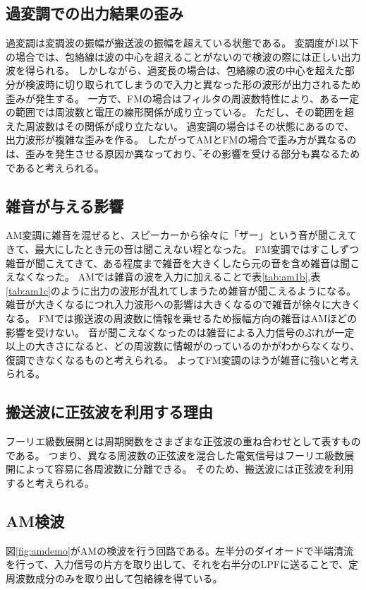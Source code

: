 \documentclass[11pt,a4j]{jsarticle}
\begin{document}
\subsection{過変調での出力結果の歪み}
過変調は変調波の振幅が搬送波の振幅を超えている状態である。
変調度が1以下の場合では、包絡線は波の中心を超えることがないので検波の際には正しい出力波を得られる。
しかしながら、過変長の場合は、包絡線の波の中心を超えた部分が検波時に切り取られてしまうので入力と異なった形の波形が出力されるため歪みが発生する。
一方で、FMの場合はフィルタの周波数特性により、ある一定の範囲では周波数と電圧の線形関係が成り立っている。
ただし、その範囲を超えた周波数はその関係が成り立たない。
過変調の場合はその状態にあるので、出力波形が複雑な歪みを作る。
したがってAMとFMの場合で歪み方が異なるのは、歪みを発生させる原因か異なっており、゙その影響を受ける部分も異なるためであると考えられる。

\subsection{雑音が与える影響}
AM変調に雑音を混ぜると、スピーカーから徐々に「ザー」という音が聞こえてきて、最大にしたとき元の音は聞こえない程となった。
FM変調ではすこしずつ雑音が聞こえてきて、ある程度まで雑音を大きくしたら元の音を含め雑音は聞こえなくなった。
AMでは雑音の波を入力に加えることで表\ref{tab:am1b},表\ref{tab:am1c}のように出力の波形が乱れてしまうため雑音が聞こえるようになる。
雑音が大きくなるにつれ入力波形への影響は大きくなるので雑音が徐々に大きくなる。
FMでは搬送波の周波数に情報を乗せるため振幅方向の雑音はAMほどの影響を受けない。
音が聞こえなくなったのは雑音による入力信号のぶれが一定以上の大きさになると、どの周波数に情報がのっているのかがわからなくなり、復調できなくなるものと考えられる。
よってFM変調のほうが雑音に強いと考えられる。

\subsection{搬送波に正弦波を利用する理由}
フーリエ級数展開とは周期関数をさまざまな正弦波の重ね合わせとして表すものである。
つまり、異なる周波数の正弦波を混合した電気信号はフーリエ級数展開によって容易に各周波数に分離できる。
そのため、搬送波には正弦波を利用すると考えられる。


\subsection{AM検波}
図\ref{fig:amdemo}がAMの検波を行う回路である。左半分のダイオードで半端清流を行って、入力信号の片方を取り出して、それを右半分のLPFに送ることで、定周波数成分のみを取り出して包絡線を得ている。
\end{document}

